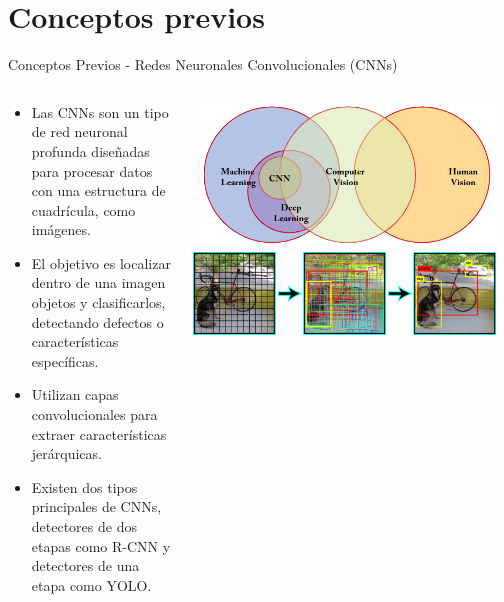 \documentclass[spanish]{beamer}
\begin{document}
 \section{Conceptos previos}
            \begin{frame}{Conceptos Previos - Redes Neuronales Convolucionales (CNNs)}
                \begin{columns}
                    \begin{column}{0.5\textwidth}
                        \begin{itemize}
                            \item Las CNNs son un tipo de red neuronal profunda diseñadas para procesar datos con una estructura de cuadrícula, como imágenes.
                            \item El objetivo es localizar dentro de una imagen objetos y clasificarlos, detectando defectos o características específicas.
                            \item Utilizan capas convolucionales para extraer características jerárquicas.
                            \item Existen dos tipos principales de CNNs, detectores de dos etapas como R-CNN y detectores de una etapa como YOLO.
                            
                        \end{itemize}
                    \end{column}
        \begin{column}{0.5\textwidth}
            \includegraphics[width=0.95\textwidth]{images/conceptos_previos/diagrama_de_Venn_inteligencia_artificial.png}
            \includegraphics[width=0.95\textwidth]{images/conceptos_previos/yolo.png}
        \end{column}
    \end{columns}
\end{frame}
\end{document}
